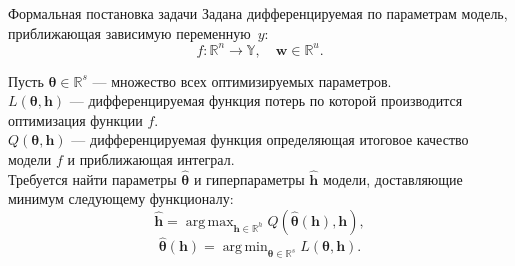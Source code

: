 \documentclass[10pt,pdf,utf8,russian,aspectratio=169]{beamer}
\DeclareMathOperator*{\argmin}{arg\,min}
\DeclareMathOperator*{\argmax}{arg\,max}
\begin{document}
\begin{frame}{Формальная постановка задачи}
Задана дифференцируемая по параметрам модель, приближающая зависимую переменную~$y$:
\[
	f:\mathbb{R}^n \to \mathbb{Y}, \quad \mathbf{w} \in \mathbb{R}^u.
\]

Пусть $\boldsymbol{\theta} \in \mathbb{R}^s$ --- множество всех оптимизируемых параметров.\\
$L(\boldsymbol{\theta}, \mathbf{h})$ ---  дифференцируемая функция потерь  по которой производится оптимизация функции ${f}$. \\
$Q(\boldsymbol{\theta}, \mathbf{h})$ ---  дифференцируемая функция определяющая итоговое качество модели ${f}$ и приближающая интеграл.\\

Требуется найти параметры $\hat{\boldsymbol{\theta}}$ и гиперпараметры $\hat{\mathbf{h}}$ модели, доставляющие минимум следующему функционалу:
\[
\hat{\mathbf{h}} = \argmax_{\mathbf{h} \in \mathbb{R}^h} Q(\hat{\boldsymbol{\theta}}(\mathbf{h}), \mathbf{h}),
\]
\[
	\hat{\boldsymbol{\theta}}(\mathbf{h}) =  \argmin_{\boldsymbol{\theta} \in \mathbb{R}^s} L(\boldsymbol{\theta}, \mathbf{h}).
\]
\end{frame}

\end{document}
